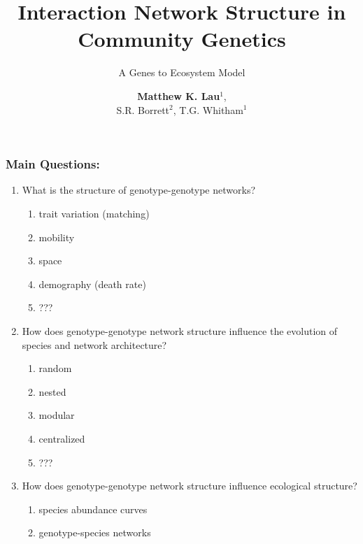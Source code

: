 \documentclass[serif,mathserif]{beamer}
\title[Community Genetics
  Model \hspace{2em}\insertframenumber]{Interaction Network Structure
  in Community Genetics}
\subtitle{A Genes to Ecosystem Model}
\author[]{\textbf{Matthew K. Lau$^1$},\\ S.R. Borrett$^2$, T.G. Whitham$^1$}
\date{}
\institute[\url{http://dana.ucc.nau.edu/~mkl48/bio/home.html}]{
Northern Arizona University$^1$ \\
University of North Carolina$^2$
}
\begin{document}

\frame{\titlepage}




\begin{frame}
  \frametitle{Main Questions:}
  \begin{enumerate}
  \item What is the structure of genotype-genotype networks? 
    \begin{enumerate}
    \item trait variation (matching)
    \item mobility
    \item space
    \item demography (death rate)
    \item ???
    \end{enumerate}
  \item How does genotype-genotype network structure influence the
    evolution of species and network architecture?
    \begin{enumerate}
    \item random
    \item nested
    \item modular
    \item centralized
    \item ???
    \end{enumerate}
  \item How does genotype-genotype network structure influence
    ecological structure?
    \begin{enumerate}
    \item species abundance curves
    \item genotype-species networks
    \end{enumerate}
  \end{enumerate}
\end{frame}
\end{document}
